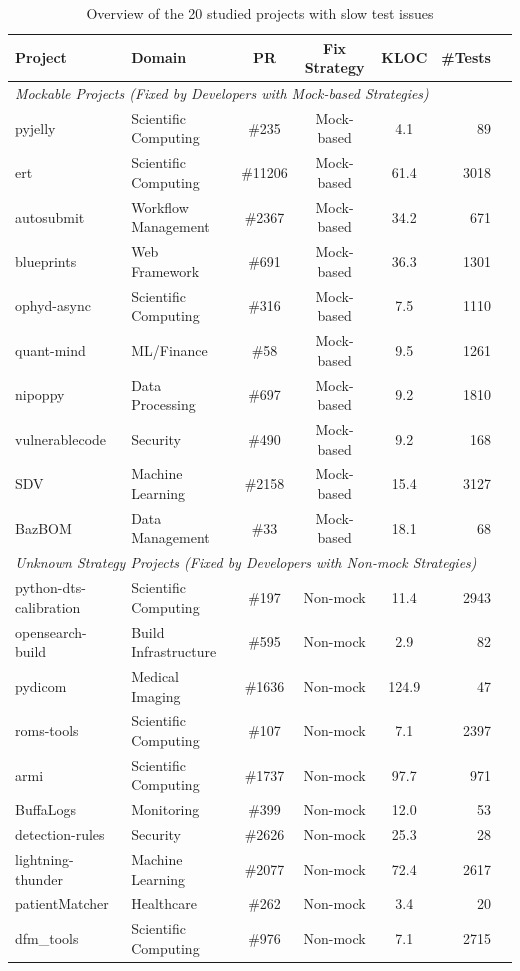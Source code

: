 \begin{table}[t]
\centering
\caption{Overview of the 20 studied projects with slow test issues}
\label{tab:studied-projects}
\begin{tabular}{llcccrr}
\toprule
\textbf{Project} & \textbf{Domain} & \textbf{PR} & \textbf{Fix Strategy} & \textbf{KLOC} & \textbf{\#Tests} \\
\midrule
\multicolumn{6}{l}{\textit{Mockable Projects (Fixed by Developers with Mock-based Strategies)}} \\
pyjelly & Scientific Computing & \#235 & Mock-based & 4.1 & 89 \\
ert & Scientific Computing & \#11206 & Mock-based & 61.4 & 3018 \\
autosubmit & Workflow Management & \#2367 & Mock-based & 34.2 & 671 \\
blueprints & Web Framework & \#691 & Mock-based & 36.3 & 1301 \\
ophyd-async & Scientific Computing & \#316 & Mock-based & 7.5 & 1110 \\
quant-mind & ML/Finance & \#58 & Mock-based & 9.5 & 1261 \\
nipoppy & Data Processing & \#697 & Mock-based & 9.2 & 1810 \\
vulnerablecode & Security & \#490 & Mock-based & 9.2 & 168 \\
SDV & Machine Learning & \#2158 & Mock-based & 15.4 & 3127 \\
BazBOM & Data Management & \#33 & Mock-based & 18.1 & 68 \\
\midrule
\multicolumn{6}{l}{\textit{Unknown Strategy Projects (Fixed by Developers with Non-mock Strategies)}} \\
python-dts-calibration & Scientific Computing & \#197 & Non-mock & 11.4 & 2943 \\
opensearch-build & Build Infrastructure & \#595 & Non-mock & 2.9 & 82 \\
pydicom & Medical Imaging & \#1636 & Non-mock & 124.9 & 47 \\
roms-tools & Scientific Computing & \#107 & Non-mock & 7.1 & 2397 \\
armi & Scientific Computing & \#1737 & Non-mock & 97.7 & 971 \\
BuffaLogs & Monitoring & \#399 & Non-mock & 12.0 & 53 \\
detection-rules & Security & \#2626 & Non-mock & 25.3 & 28 \\
lightning-thunder & Machine Learning & \#2077 & Non-mock & 72.4 & 2617 \\
patientMatcher & Healthcare & \#262 & Non-mock & 3.4 & 20 \\
dfm\_tools & Scientific Computing & \#976 & Non-mock & 7.1 & 2715 \\
\bottomrule
\end{tabular}
\end{table}
